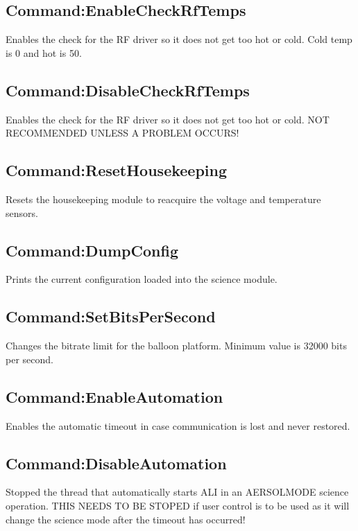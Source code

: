 \subsection{Command:EnableCheckRfTemps}

Enables the check for the RF driver so it does not get too hot or cold. Cold temp is 0 and hot is 50.

\subsection{Command:DisableCheckRfTemps}

Enables the check for the RF driver so it does not get too hot or cold. NOT RECOMMENDED UNLESS A PROBLEM OCCURS!

\subsection{Command:ResetHousekeeping}

Resets the housekeeping module to reacquire the voltage and temperature sensors.

\subsection{Command:DumpConfig}

Prints the current configuration loaded into the science module.

\subsection{Command:SetBitsPerSecond}

Changes the bitrate limit for the balloon platform. Minimum value is 32000 bits per second.

\subsection{Command:EnableAutomation}

Enables the automatic timeout in case communication is lost and never restored.

\subsection{Command:DisableAutomation}

Stopped the thread that automatically starts ALI in an AERSOL\textunderscore MODE science operation. THIS NEEDS TO BE STOPED if user control is to be used as it will change the science mode after the timeout has occurred!

